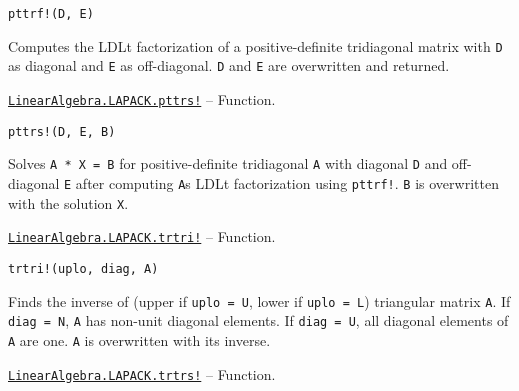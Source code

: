 \begin{adjustwidth}{2em}{0pt}


\begin{verbatim}
pttrf!(D, E)
\end{verbatim}

Computes the LDLt factorization of a positive-definite tridiagonal matrix with \texttt{D} as diagonal and \texttt{E} as off-diagonal. \texttt{D} and \texttt{E} are overwritten and returned.



\end{adjustwidth}
\hypertarget{17187703179587619260}{} 
\hyperlink{17187703179587619260}{\texttt{LinearAlgebra.LAPACK.pttrs!}}  -- {Function.}

\begin{adjustwidth}{2em}{0pt}


\begin{verbatim}
pttrs!(D, E, B)
\end{verbatim}

Solves \texttt{A * X = B} for positive-definite tridiagonal \texttt{A} with diagonal \texttt{D} and off-diagonal \texttt{E} after computing \texttt{A}{\textquotesingle}s LDLt factorization using \texttt{pttrf!}. \texttt{B} is overwritten with the solution \texttt{X}.



\end{adjustwidth}
\hypertarget{16492831209199043329}{} 
\hyperlink{16492831209199043329}{\texttt{LinearAlgebra.LAPACK.trtri!}}  -- {Function.}

\begin{adjustwidth}{2em}{0pt}


\begin{verbatim}
trtri!(uplo, diag, A)
\end{verbatim}

Finds the inverse of (upper if \texttt{uplo = U}, lower if \texttt{uplo = L}) triangular matrix \texttt{A}. If \texttt{diag = N}, \texttt{A} has non-unit diagonal elements. If \texttt{diag = U}, all diagonal elements of \texttt{A} are one. \texttt{A} is overwritten with its inverse.



\end{adjustwidth}
\hypertarget{1291729511408073349}{} 
\hyperlink{1291729511408073349}{\texttt{LinearAlgebra.LAPACK.trtrs!}}  -- {Function.}

